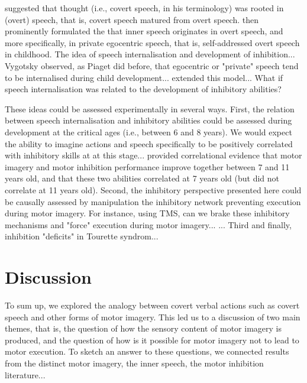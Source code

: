 \documentclass[utf8]{template/frontiersSCNS} %
\begin{document}
\cite{watson_psychology_1919} suggested that thought (i.e., covert speech, in his terminology) was rooted in (overt) speech, that is, covert speech matured from overt speech. \cite{vygotsky_thought_1934} then prominently formulated the that inner speech originates in overt speech, and more specifically, in private egocentric speech, that is, self-addressed overt speech in childhood. The idea of speech internalisation and development of inhibition... Vygotsky observed, as Piaget did before, that egocentric or "private" speech tend to be internalised during child development... \cite{fernyhough_alien_2004} extended this model... What if speech internalisation was related to the development of inhibitory abilities?

These ideas could be assessed experimentally in several ways. First, the relation between speech internalisation and inhibitory abilities could be assessed during development at the critical ages (i.e., between 6 and 8 years). We would expect the ability to imagine actions and speech specifically to be positively correlated with inhibitory skills at at this stage...  \cite{wang_relationship_2021} provided correlational evidence that motor imagery and motor inhibition performance improve together between 7 and 11 years old, and that these two abilities correlated at 7 years old (but did not correlate at 11 years old). Second, the inhibitory perspective presented here could be causally assessed by manipulation the inhibitory network preventing execution during motor imagery. For instance, using TMS, can we brake these inhibitory mechanisms and "force" execution during motor imagery... \citep{angelini_motor_2015, angelini_proactive_2016}... Third and finally, inhibition "deficits" in Tourette syndrom...

\section{Discussion}


To sum up, we explored the analogy between covert verbal actions such as covert speech and other forms of motor imagery. This led us to a discussion of two main themes, that is, the question of how the sensory content of motor imagery is produced, and the question of how is it possible for motor imagery not to lead to motor execution. To sketch an answer to these questions, we connected results from the distinct motor imagery, the inner speech, the motor inhibition literature...
\end{document}

